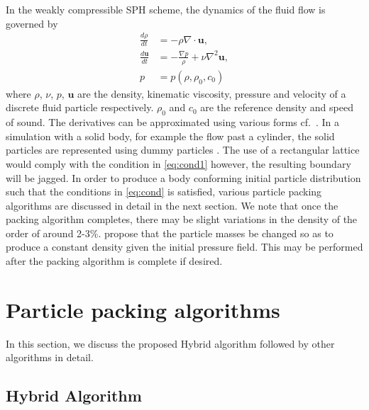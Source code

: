 \documentclass[preprint,12pt]{elsarticle}
\newcommand{\ten}[1]{\ensuremath{\mathbf{#1}}}
\begin{document}
In the weakly compressible SPH scheme, the dynamics of the fluid flow is
governed by
\begin{align}
  \label{eq:ce}
  \frac{d \rho}{d t} & = - \rho \nabla \cdot \ten{u}, \\ \label{eq:mom}
  \frac{d \ten{u}}{d t} & = - \frac{\nabla p}{\rho}  + \nu \nabla^2 \ten{u},\\
  p & = p(\rho, \rho_0, c_0) \label{eq:eos}
\end{align}
where $\rho$, $\nu$, $p$, $\ten{u}$ are the density, kinematic viscosity,
pressure and velocity of a discrete fluid particle respectively. $\rho_0$ and
$c_0$ are the reference density and speed of sound. The derivatives can be
approximated using various forms cf.~\cite{violeau_book_2012}. In a simulation
with a solid body, for example the flow past a cylinder, the solid particles
are represented using dummy particles \cite{Adami2012}. The use of a
rectangular lattice would comply with the condition in \cref{eq:cond1}
however, the resulting boundary will be jagged. In order to produce a body
conforming initial particle distribution such that the conditions in
\cref{eq:cond} is satisfied, various particle packing algorithms are discussed
in detail in the next section. We note that once the packing algorithm
completes, there may be slight variations in the density of the order of
around 2-3\%. \citet{colagrossi2012particle} propose that the particle masses
be changed so as to produce a constant density given the initial pressure
field. This may be performed after the packing algorithm is complete if
desired.

\section{Particle packing algorithms}
\label{sec:alg}

In this section, we discuss the proposed Hybrid algorithm followed by other
algorithms in detail.

\subsection{Hybrid Algorithm}
\label{sec:hybrid}
\end{document}
